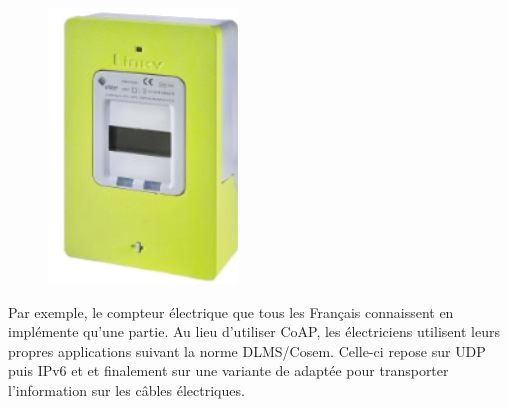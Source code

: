    \begin{figure}
\centerline{\includegraphics[width=.4\columnwidth]{Pictures/linky.png}}
\end{figure}

Par exemple, le compteur électrique  que tous les Français connaissent en implémente qu'une partie. Au lieu d'utiliser \ac{CoAP}, les électriciens utilisent leurs propres applications suivant la norme \ac{DLMS}/\ac{Cosem}. Celle-ci repose sur \ac{UDP} puis \ac{IPv6} et  et finalement sur une variante de  adaptée pour transporter l'information sur les câbles électriques.
